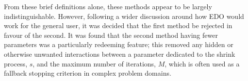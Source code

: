 From these brief definitions alone, these methods appear to be largely
indistinguishable. However, following a wider discussion around how EDO would
work for the general user, it was decided that the first method be rejected in
favour of the second. It was found that the second method having fewer
parameters was a particularly redeeming feature; this removed any hidden or
otherwise unwanted interactions between a parameter dedicated to the shrink
process, \(s\), and the maximum number of iterations, \(M\), which is often used
as a fallback stopping criterion in complex problem domains.


